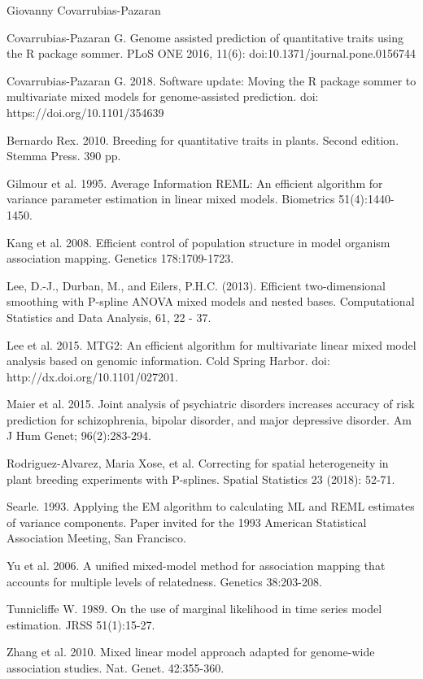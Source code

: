 \documentclass[a4paper]{book}
\begin{document}
%
\begin{Author}\relax
Giovanny Covarrubias-Pazaran
\end{Author}
%
\begin{References}\relax

Covarrubias-Pazaran G. Genome assisted prediction of quantitative traits using the R package sommer. PLoS ONE 2016, 11(6): doi:10.1371/journal.pone.0156744   

Covarrubias-Pazaran G. 2018. Software update: Moving the R package sommer to multivariate mixed models for genome-assisted prediction. doi: https://doi.org/10.1101/354639

Bernardo Rex. 2010. Breeding for quantitative traits in plants. Second edition. Stemma Press. 390 pp.

Gilmour et al. 1995. Average Information REML: An efficient algorithm for variance parameter estimation in linear mixed models. Biometrics 51(4):1440-1450.

Kang et al. 2008. Efficient control of population structure in model organism association mapping. Genetics 178:1709-1723.

Lee, D.-J., Durban, M., and Eilers, P.H.C. (2013). Efficient two-dimensional smoothing with P-spline ANOVA mixed models and nested bases. Computational Statistics and Data Analysis, 61, 22 - 37.

Lee et al. 2015. MTG2: An efficient algorithm for multivariate linear mixed model analysis based on genomic information. Cold Spring Harbor. doi: http://dx.doi.org/10.1101/027201.

Maier et al. 2015. Joint analysis of psychiatric disorders increases accuracy of risk prediction for schizophrenia, bipolar disorder, and major depressive disorder. Am J Hum Genet; 96(2):283-294.

Rodriguez-Alvarez, Maria Xose, et al. Correcting for spatial heterogeneity in plant breeding experiments with P-splines. Spatial Statistics 23 (2018): 52-71.

Searle. 1993. Applying the EM algorithm to calculating ML and REML estimates of variance components. Paper invited for the 1993 American Statistical Association Meeting, San Francisco.

Yu et al. 2006. A unified mixed-model method for association mapping that accounts for multiple levels of relatedness. Genetics 38:203-208.

Tunnicliffe W. 1989. On the use of marginal likelihood in time series model estimation. JRSS 51(1):15-27.

Zhang et al. 2010. Mixed linear model approach adapted for genome-wide association studies. Nat. Genet. 42:355-360.

\end{References}
\end{document}
